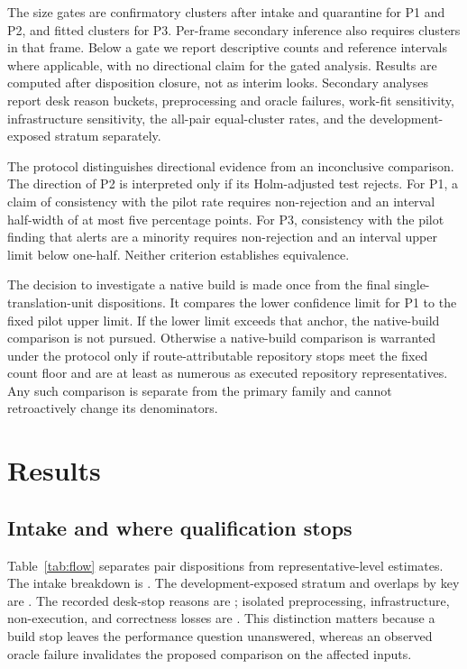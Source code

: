 \documentclass[11pt]{article}
\begin{document}
The size gates are \BenchMinClusters{} confirmatory clusters after intake
and quarantine for P1 and P2, and \BenchMinFits{} fitted clusters for P3.
Per-frame secondary inference also requires \BenchMinFits{} clusters in
that frame. Below a gate we report descriptive counts and reference
intervals where applicable, with no directional claim for the gated
analysis. Results are computed after disposition closure, not as interim
looks. Secondary analyses report desk reason buckets, preprocessing and
oracle failures, work-fit sensitivity, infrastructure sensitivity, the
all-pair equal-cluster rates, and the development-exposed stratum
separately.

The protocol distinguishes directional evidence from an inconclusive
comparison. The direction of P2 is interpreted only if its Holm-adjusted
test rejects. For P1, a claim of consistency with the pilot rate
requires non-rejection and an interval half-width of at most five
percentage points. For P3, consistency with the pilot finding that
alerts are a minority requires non-rejection and an interval upper
limit below one-half. Neither criterion establishes equivalence.

The decision to investigate a native build is made once from the final
single-translation-unit dispositions. It compares the lower confidence
limit for P1 to the fixed pilot upper limit. If the lower limit exceeds
that anchor, the native-build comparison is not pursued. Otherwise a
native-build comparison is warranted under the protocol only if
route-attributable repository stops meet the fixed count floor and are at
least as numerous as executed repository representatives. Any such
comparison is separate from the primary family and cannot retroactively
change its denominators.

\section{Results}
\label{sec:results}

\subsection{Intake and where qualification stops}

Table~\ref{tab:flow} separates pair dispositions from representative-level
estimates. The intake breakdown is \BenchIntakeStops. The
development-exposed stratum and overlaps by key are \BenchOverlap.
The recorded desk-stop reasons are \BenchDeskReasons; isolated
preprocessing, infrastructure, non-execution, and correctness losses
are \BenchRunStops. This distinction matters because a build stop leaves
the performance question unanswered, whereas an observed oracle failure
invalidates the proposed comparison on the affected inputs.
\end{document}
